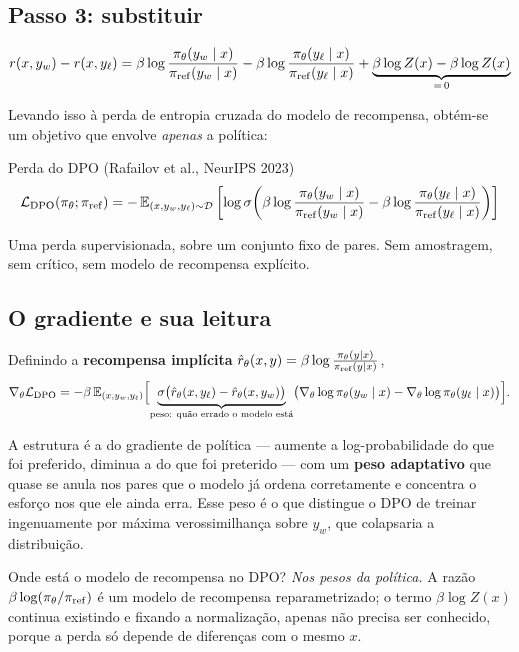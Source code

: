 \documentclass[11pt, a4paper]{article}
\newcommand{\thv}{\theta}
\newcommand{\polth}{\pol_{\thv}}
\newcommand{\pref}{\pol_{\mathrm{ref}}}
\newcommand{\Dset}{\mathcal{D}}
\newcommand{\yw}{y_{w}}
\newcommand{\yl}{y_{\ell}}
\newcommand{\sig}{\sigma}
\newcommand{\gth}{\nabla_{\thv}}
\begin{document}
\subsection{Passo 3: substituir}

\[
  r(x,\yw) - r(x,\yl)
  = \beta\log\frac{\polth(\yw\mid x)}{\pref(\yw\mid x)}
  - \beta\log\frac{\polth(\yl\mid x)}{\pref(\yl\mid x)}
  + \underbrace{\beta\log Z(x) - \beta\log Z(x)}_{=\,0}
\]

Levando isso à perda de entropia cruzada do modelo de recompensa, obtém-se um
objetivo que envolve \emph{apenas} a política:

\begin{teobox}{Perda do DPO (Rafailov et al., NeurIPS 2023)}
\[
  \mathcal{L}_{\mathrm{DPO}}(\polth;\pref)
  = -\,\E_{(x,\yw,\yl)\sim\Dset}\left[\log\sig\!\left(
      \beta\log\frac{\polth(\yw\mid x)}{\pref(\yw\mid x)}
    - \beta\log\frac{\polth(\yl\mid x)}{\pref(\yl\mid x)}\right)\right]
\]
\end{teobox}

Uma perda supervisionada, sobre um conjunto fixo de pares. Sem amostragem, sem
crítico, sem modelo de recompensa explícito.

\subsection{O gradiente e sua leitura}

Definindo a \textbf{recompensa implícita}
$\hat r_{\thv}(x,y) = \beta\log\frac{\polth(y\mid x)}{\pref(y\mid x)}$,
\[
  \gth\mathcal{L}_{\mathrm{DPO}} = -\beta\,\E_{(x,\yw,\yl)}\Bigl[
    \underbrace{\sig\bigl(\hat r_{\thv}(x,\yl) - \hat r_{\thv}(x,\yw)\bigr)}_{\text{peso: quão errado o modelo está}}
    \bigl(\gth\log\polth(\yw\mid x) - \gth\log\polth(\yl\mid x)\bigr)\Bigr].
\]

A estrutura é a do gradiente de política --- aumente a log-probabilidade do que
foi preferido, diminua a do que foi preterido --- com um \textbf{peso adaptativo}
que quase se anula nos pares que o modelo já ordena corretamente e concentra o
esforço nos que ele ainda erra. Esse peso é o que distingue o DPO de treinar
ingenuamente por máxima verossimilhança sobre $\yw$, que colapsaria a
distribuição.

\begin{ideiabox}
Onde está o modelo de recompensa no DPO? \emph{Nos pesos da política.} A razão
$\beta\log(\polth/\pref)$ é um modelo de recompensa reparametrizado; o termo
$\beta\log Z(x)$ continua existindo e fixando a normalização, apenas não precisa
ser conhecido, porque a perda só depende de diferenças com o mesmo $x$.
\end{ideiabox}
\end{document}
